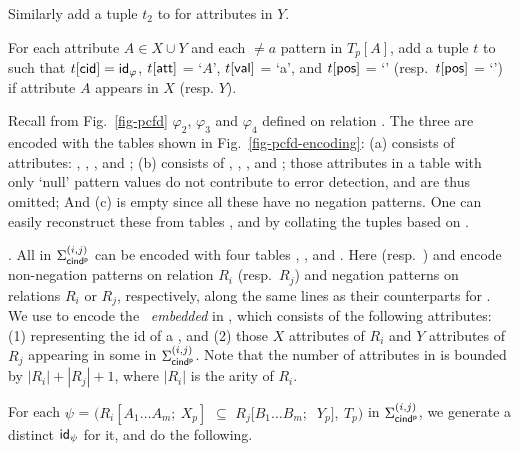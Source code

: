 \item[(2)] Similarly add a tuple $t_2$ to  for attributes in $Y$.


\item[(3)] For each attribute $A\in X\cup Y$ and each $\ne a$ pattern in
$T_p[A]$, add a tuple $t$ to \Enc{\ne} such that $t[\protect\mathsf{cid}] =
{\mathsf{id}}_\varphi$, $t[\protect\mathsf{att}]$ = `$A$', $t[\protect\mathsf{val}]$ = `a', and
$t[\protect\mathsf{pos}]$ = `\LHS' (resp.~$t[\protect\mathsf{pos}]$ = `\RHS') if attribute
$A$ appears in $X$ (resp. $Y$). \ei\vspace{-1ex}





\begin{example}
Recall from Fig.~\ref{fig-pcfd} \pCFDs $\varphi_2$, $\varphi_3$ and
$\varphi_4$ defined on relation . The three \pCFDs are
encoded with the tables shown in Fig.~\ref{fig-pcfd-encoding}: (a)
 consists of attributes: , , ,
 and ; (b)  consists of
, , ,  and
; those attributes in a table with only `null' pattern
values do not contribute to error detection, and are thus omitted;
And (c) \Enc{\ne} is empty since all these \pCFDs have no negation
patterns. One can easily reconstruct these \pCFDs from tables
,  and \Enc{\ne} by collating the tuples based on
.
\end{example}





. All \pCINDs in $\Sigma_{{\mathsf{cind^p}}}^{(i,j)}$
can be encoded with four tables
\Enc{}, ,  and \Enc{\ne}.
Here  (resp.~) and \Enc{\ne} encode non-negation
patterns on relation $R_i$ (resp.~$R_j$)
and negation patterns on relations $R_i$ or $R_j$,
respectively, along the same lines as their counterparts for
\pCFDs. We use
\Enc{} to encode the \INDs\ {\em embedded} in
\pCINDs, which consists of the following attributes: (1) 
representing the id of a \pCIND,  and (2) those $X$ attributes of $R_i$
and $Y$ attributes of $R_j$ appearing in some \pCINDs in $\Sigma_{{\mathsf{cind^p}}}^{(i,j)}$.
Note that the number of attributes in \Enc{} is bounded by $|R_i| + |R_j|
+ 1$, where $|R_i|$ is the arity of $R_i$.


For each \pCIND $\psi$ = $(R_i[A_1\ldots A_m;\ X_p]$ $\subseteq$
$R_j[B_1\ldots B_m;$ $\ Y_p],\ T_p)$ in $\Sigma_{{\mathsf{cind^p}}}^{(i,j)}$, we generate a
distinct  ${\mathsf{id}}_\psi$ for it, and do the following.

